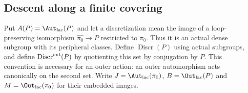 \subsection{Descent along a finite covering}

Put $A(P)=\Aut_{\rm lac}(P)$ and let a discretization mean the image of a loop-preserving isomorphism $\widehat{\pi_0}\to P$ restricted to $\pi_0$. Thus it is an actual dense subgroup with its peripheral classes. Define $\operatorname{Discr}(P)$ using actual subgroups, and define $\operatorname{Discr}^{\rm out}(P)$ by quotienting this set by conjugation by $P$. This convention is necessary for an outer action: an outer automorphism acts canonically on the second set. Write $J=\Aut_{\rm lac}(\pi_0)$, $B=\Out_{\rm lac}(P)$ and $M=\Out_{\rm lac}(\pi_0)$ for their embedded images.

